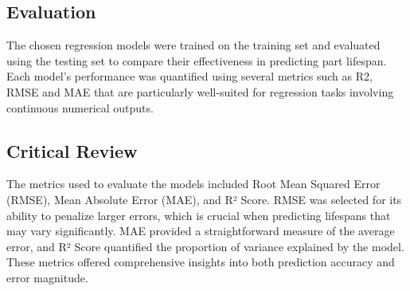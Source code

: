\documentclass{article}
\begin{document}
\subsection{Evaluation}
The chosen regression models were trained on the training set and evaluated using the testing set to compare their effectiveness in predicting part lifespan. Each model's performance was quantified using several metrics such as R2, RMSE and MAE that are particularly well-suited for regression tasks involving continuous numerical outputs.\subsection{Critical Review}
The metrics used to evaluate the models included Root Mean Squared Error (RMSE), Mean Absolute Error (MAE), and R² Score. RMSE was selected for its ability to penalize larger errors, which is crucial when predicting lifespans that may vary significantly. MAE provided a straightforward measure of the average error, and R² Score quantified the proportion of variance explained by the model. These metrics offered comprehensive insights into both prediction accuracy and error magnitude.
\end{document}
